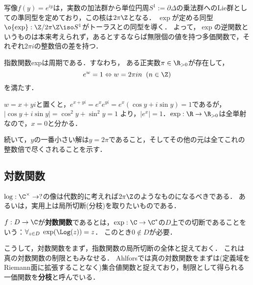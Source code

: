 \documentclass[uplatex, dvipdfmx]{jsreport}
\begin{document}
\begin{tcolorbox}[colframe=ForestGreen, colback=ForestGreen!10!white,breakable,colbacktitle=ForestGreen!40!white,coltitle=black,fonttitle=\bfseries\sffamily,
title=]
    写像$f(y)=e^{iy}$は，実数の加法群から単位円周$S^1:=\partial\Delta$の乗法群へのLie群としての準同型を定めており，この核は$2\pi\Z$となる．
    $\exp$が定める同型$\o{\exp}:\Z/2\pi\Z\iso S^1$がトーラスとの同型を導く．
    よって，$\exp$の逆関数というものは本来考えられず，あるとするならば無限個の値を持つ多価関数で，それぞれ$2\pi i$の整数倍の差を持つ．
\end{tcolorbox}

\begin{theorem}[指数関数の周期性]\label{thm-period-of-exponential}
    指数関数expは周期である．すなわち，
    ある正実数$\pi\in\R_{>0}$が存在して，
    \[ e^w=1\Leftrightarrow w=2\pi in\;\;(n\in\Z) \]
    を満たす．
\end{theorem}
\begin{Proof}\mbox{}
    $w=x+yi$と置くと，$e^{x+yi}=e^xe^{yi}=e^x(\cos y+i\sin y)=1$であるが，$|\cos y+i\sin y|=\cos^2y+\sin^2y=1$
    より，$|e^x|=1$．$\exp:\R\to\R_{>0}$は全単射なので，$x=0$と分かる．

    続いて，$y$の一番小さい解は$y=2\pi$であること，そしてその他の元は全てこれの整数倍で尽くされることを示す．
\end{Proof}

\subsection{対数関数}

\begin{tcolorbox}[colframe=ForestGreen, colback=ForestGreen!10!white,breakable,colbacktitle=ForestGreen!40!white,coltitle=black,fonttitle=\bfseries\sffamily,
title=]
    $\log:\C^\times\to?$の像は代数的に考えれば$2\pi\Z$のようなものになるべきである．
    あるいは，実用上は局所切断(分枝)を取りたいものである．
\end{tcolorbox}

\begin{definition}
    $f:D\to\C$が\textbf{対数関数}であるとは，$\exp:\C\to\C^*$の$D$上での切断であることをいう：$\forall_{z\in D}\;\exp(\Log(z))=z$．
    このとき$0\notin D$が必要．
\end{definition}
\begin{remarks}
    こうして，対数関数をまず，指数関数の局所切断の全体と捉えておく．
    これは真の対数関数の制限ともみなせる．
    Ahlforsでは真の対数関数をまずは(定義域をRiemann面に拡張することなく)集合値関数と捉えており，制限として得られる一価関数を\textbf{分枝}と呼んでいる．
\end{remarks}
\end{document}
